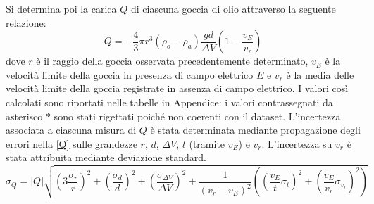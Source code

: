 \documentclass[]{article}
\newcommand{\abs}[1]{\left\lvert#1\right\rvert}
\begin{document}
    Si determina poi la carica $Q$ di ciascuna goccia di olio attraverso la seguente relazione:
    \begin{equation}
        \label{Q}
        Q = -\frac{4}{3} \pi r^3 \left( \rho_o - \rho_a \right) \frac{g d}{\Delta V} \left( 1 - \frac{v_E}{v_r} \right)
    \end{equation}
    dove $r$ è il raggio della goccia osservata precedentemente determinato, $v_E$ è la velocità limite della goccia in presenza di campo elettrico $E$ e $v_r$ è la media delle velocità limite della goccia registrate in assenza di campo elettrico.
    I valori così calcolati sono riportati nelle tabelle in Appendice: i valori contrassegnati da asterisco $\ast$ sono stati rigettati poiché non coerenti con il dataset.
    L'incertezza associata a ciascuna misura di $Q$ è stata determinata mediante propagazione degli errori nella \ref{Q} sulle grandezze $r$, $d$, $\Delta V$, $t$ (tramite $v_E$) e $v_r$. L'incertezza su $v_r$ è stata attribuita mediante deviazione standard.
    \begin{equation}
        \label{sigma-Q}
        \sigma_Q = \abs{Q} \sqrt{ \left( 3 \frac{\sigma_r}{r} \right)^2 + \left( \frac{\sigma_d}{d} \right)^2 + \left( \frac{\sigma_{\Delta V}}{\Delta V} \right)^2 + \frac{1}{\left( v_r - v_E \right)^2} \left( \left( \frac{v_E}{t} \sigma_t \right)^2 + \left( \frac{v_E}{v_r} \sigma_{v_r} \right)^2 \right) }
    \end{equation}
\end{document}

